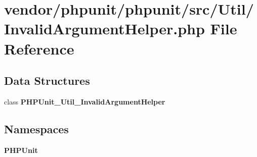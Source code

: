 \section{vendor/phpunit/phpunit/src/\+Util/\+Invalid\+Argument\+Helper.php File Reference}
\label{phpunit_2src_2_util_2_invalid_argument_helper_8php}
\subsection*{Data Structures}
\begin{DoxyCompactItemize}
\item 
class {\bf P\+H\+P\+Unit\+\_\+\+Util\+\_\+\+Invalid\+Argument\+Helper}
\end{DoxyCompactItemize}
\subsection*{Namespaces}
\begin{DoxyCompactItemize}
\item 
 {\bf P\+H\+P\+Unit}
\end{DoxyCompactItemize}
